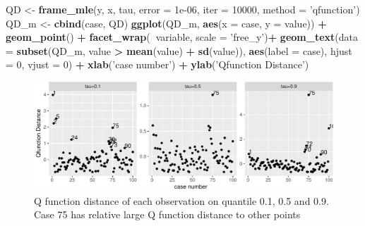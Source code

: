 \documentclass[11pt,a4paper,]{article}
\newenvironment{Shaded}{\begin{snugshade}}{\end{snugshade}}
\newcommand{\KeywordTok}[1]{\textcolor[rgb]{0.13,0.29,0.53}{\textbf{#1}}}
\newcommand{\DataTypeTok}[1]{\textcolor[rgb]{0.13,0.29,0.53}{#1}}
\newcommand{\DecValTok}[1]{\textcolor[rgb]{0.00,0.00,0.81}{#1}}
\newcommand{\FloatTok}[1]{\textcolor[rgb]{0.00,0.00,0.81}{#1}}
\newcommand{\StringTok}[1]{\textcolor[rgb]{0.31,0.60,0.02}{#1}}
\newcommand{\OperatorTok}[1]{\textcolor[rgb]{0.81,0.36,0.00}{\textbf{#1}}}
\newcommand{\NormalTok}[1]{#1}
\theoremstyle{definition}
\theoremstyle{definition}
\theoremstyle{remark}
\begin{document}
\begin{Shaded}
\begin{Highlighting}[]
\NormalTok{QD <-}\StringTok{ }\KeywordTok{frame_mle}\NormalTok{(y, x, tau, }\DataTypeTok{error =} \FloatTok{1e-06}\NormalTok{, }\DataTypeTok{iter =} \DecValTok{10000}\NormalTok{,}
               \DataTypeTok{method =} \StringTok{'qfunction'}\NormalTok{)}
\NormalTok{QD_m <-}\StringTok{ }\KeywordTok{cbind}\NormalTok{(case, QD)}
\KeywordTok{ggplot}\NormalTok{(QD_m, }\KeywordTok{aes}\NormalTok{(}\DataTypeTok{x =}\NormalTok{ case, }\DataTypeTok{y =}\NormalTok{ value)) }\OperatorTok{+}
\StringTok{ }\KeywordTok{geom_point}\NormalTok{() }\OperatorTok{+}
\StringTok{ }\KeywordTok{facet_wrap}\NormalTok{(}\OperatorTok{~}\NormalTok{variable, }\DataTypeTok{scale =} \StringTok{'free_y'}\NormalTok{)}\OperatorTok{+}
\StringTok{ }\KeywordTok{geom_text}\NormalTok{(}\DataTypeTok{data =} \KeywordTok{subset}\NormalTok{(QD_m, value }\OperatorTok{>}\StringTok{ }\KeywordTok{mean}\NormalTok{(value) }\OperatorTok{+}\StringTok{ }\KeywordTok{sd}\NormalTok{(value)),}
           \KeywordTok{aes}\NormalTok{(}\DataTypeTok{label =}\NormalTok{ case), }\DataTypeTok{hjust =} \DecValTok{0}\NormalTok{, }\DataTypeTok{vjust =} \DecValTok{0}\NormalTok{) }\OperatorTok{+}
\StringTok{ }\KeywordTok{xlab}\NormalTok{(}\StringTok{'case number'}\NormalTok{) }\OperatorTok{+}
\StringTok{ }\KeywordTok{ylab}\NormalTok{(}\StringTok{'Qfunction Distance'}\NormalTok{)}
\end{Highlighting}
\end{Shaded}

\begin{figure}

{\centering \includegraphics{main_files/figure-latex/unnamed-chunk-6-1} 

}

\caption{Q function distance of each observation on quantile 0.1, 0.5 and 0.9. Case 75 has relative large Q function distance to other points}\label{fig:unnamed-chunk-6}
\end{figure}
\end{document}
